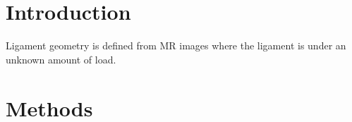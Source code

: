 \label{InverseModeling}
\section{Introduction}
Ligament geometry is defined from MR images where the ligament is under an unknown amount of load. 

\section{Methods}

